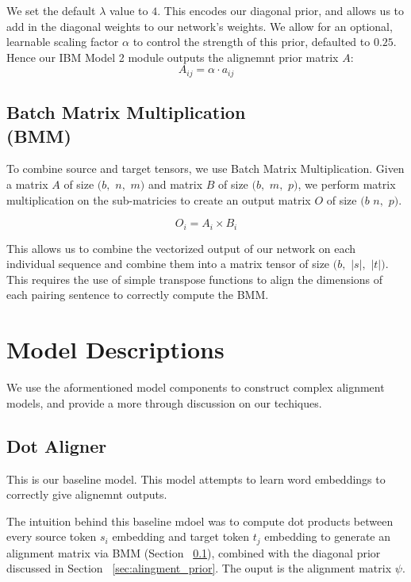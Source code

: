 \documentclass[twoside,twocolumn]{article}
\begin{document}
We set the default $\lambda$ value to $4$. This encodes our diagonal prior,
and allows us to add in the diagonal weights to our network's weights. We
allow for an optional, learnable scaling factor $\alpha$ to control the
strength of this prior, defaulted to $0.25$. Hence our IBM Model 2 module
outputs the alignemnt prior matrix $A$:
\begin{equation}
  A_{ij} = \alpha \cdot a_{ij}
\end{equation}

\subsection{Batch Matrix Multiplication\\(BMM)}
\label{sec:bmm}
To combine source and target tensors, we use Batch Matrix Multiplication.
Given a matrix $A$ of size $(b,$ $n,$ $m)$ and matrix $B$ of size
$(b,$ $m,$ $p)$, we perform matrix multiplication on the sub-matricies
to create an output matrix $O$ of size $(b$ $n,$ $p)$.

\begin{equation}
  O_i = A_i \times B_i
\end{equation}

This allows us to combine the vectorized output of our network on each
individual sequence and combine them into a matrix tensor of
size $(b,$ $|s|,$ $|t|)$. This requires the use of simple transpose
functions to align the dimensions of each pairing sentence to correctly
compute the BMM.

\section{Model Descriptions}
We use the aformentioned model components to construct complex alignment
models, and provide a more through discussion on our techiques.
\subsection{Dot Aligner}
This is our baseline model. This model attempts to learn word embeddings
to correctly give alignemnt outputs.

The intuition behind this baseline mdoel was to compute dot products
between every source token $s_i$ embedding and target token $t_j$ embedding
to generate an alignment matrix via BMM (Section ~\ref{sec:bmm}), combined
with the diagonal prior discussed in Section ~\ref{sec:alingment_prior}.
The ouput is the alignment matrix $\psi$.
\end{document}
